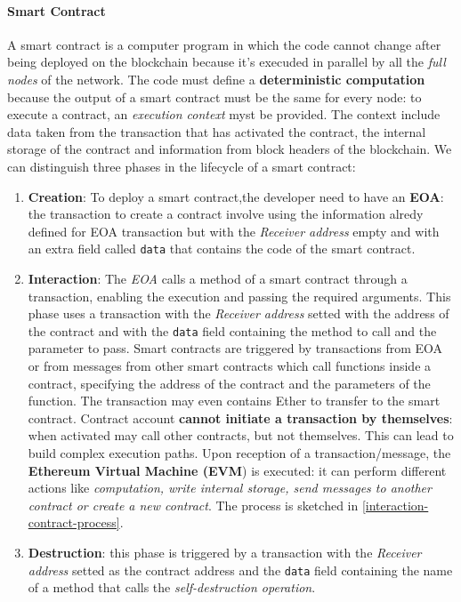 \documentclass[10pt,a4paper]{report}
\begin{document}
\paragraph{Smart Contract}\label{sec:smart-contract}
A smart contract is a computer program in which the code cannot change after being deployed on the blockchain because it's execuded in parallel by all the \textit{full nodes} of the network. The code must define a \textbf{deterministic computation} because the output of a smart contract must be the same for every node: to execute a contract, an \textit{execution context} myst be provided. The context include data taken from the transaction that has activated the contract, the internal storage of the contract and information from block headers of the blockchain.
We can distinguish three phases in the lifecycle of a smart contract:
\begin{enumerate}
	\item 
	\textbf{Creation}: To deploy a smart contract,the developer need to have an \textbf{EOA}: the transaction to create a contract involve using the information alredy defined for EOA transaction but with the \textit{Receiver address} empty and with an extra field called \texttt{data} that contains the code of the smart contract.
	\item 
	\textbf{Interaction}: The \textit{EOA} calls a method of a smart contract through a transaction, enabling the execution and passing the required arguments. This phase uses a transaction with the \textit{Receiver address} setted with the address of the contract and with the \texttt{data} field containing the method to call and the parameter to pass.
	Smart contracts are triggered by transactions from EOA or from messages from other smart contracts which call functions inside a contract, specifying the address of the contract and the parameters of the function. The transaction may even contains Ether to transfer to the smart contract.
	Contract account \textbf{cannot initiate a transaction by themselves}: when activated may call other contracts, but not themselves. This can lead to build complex execution paths.
	Upon reception of a transaction/message, the \textbf{Ethereum Virtual Machine (EVM}) is executed: it can perform different actions like \textit{computation, write internal storage, send messages to another contract or create a new contract}. The process is sketched in \ref{interaction-contract-process}.

	
	\item 
	\textbf{Destruction}: this phase is triggered by a transaction with the \textit{Receiver address} setted as the contract address and the \texttt{data} field containing the name of a method that calls the \textit{self-destruction operation}.
\end{enumerate}
\end{document}
